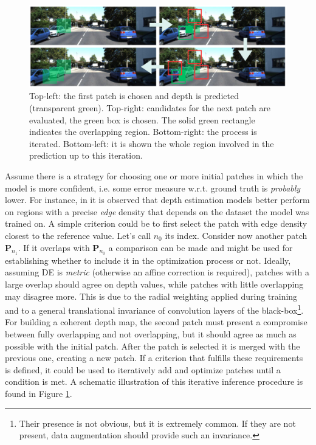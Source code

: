 \begin{figure}
    \centering
    \includegraphics[width=\textwidth]{figs/fusion_boxes}
    \caption{
        Top-left: the first patch is chosen and depth is predicted (transparent green).
        Top-right: candidates for the next patch are evaluated, the green box is chosen.
        The solid green rectangle indicates the overlapping region.
        Bottom-right: the process is iterated.
        Bottom-left: it is shown the whole region involved in the prediction up to this iteration.
        \label{fig:fusion_boxes}
    }
\end{figure}


Assume there is a strategy for choosing one or more initial patches in which the model is more confident, i.e. some error measure w.r.t. ground truth is \textit{probably} lower.
For instance, in \cite{BoostingDepth} it is observed that depth estimation models better perform on regions with a precise \textit{edge} density that depends on the dataset the model was trained on.
A simple criterion could be to first select the patch with edge density closest to the reference value.
Let's call $n_{0}$ its index.
Consider now another patch $\mathbf{P}_{n_{1}}$.
If it overlaps with $\mathbf{P}_{n_{0}}$ a comparison can be made and might be used for establishing whether to include it in the optimization process or not.
Ideally, assuming DE is \textit{metric} (otherwise an affine correction is required), patches with a large overlap should agree on depth values, while patches with little overlapping may disagree more.
This is due to the radial weighting applied during training and to a general translational invariance of convolution layers of the black-box\footnote{Their presence is not obvious, but it is extremely common. If they are not present, data augmentation should provide such an invariance.}.
For building a coherent depth map, the second patch must present a compromise between fully overlapping and not overlapping, but it should agree as much as possible with the initial patch.
After the patch is selected it is merged with the previous one, creating a new patch.
If a criterion that fulfills these requirements is defined, it could be used to iteratively add and optimize patches until a condition is met.
A schematic illustration of this iterative inference procedure is found in Figure \ref{fig:fusion_boxes}.

